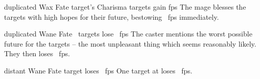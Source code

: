   {duplicated}%
  {Wax}%
  {Fate}%
  {target's Charisma}%
  {\spellArea{} targets gain  \glspl{fp}}%
  {
    The mage blesses the targets with high hopes for their future, bestowing \rollConv~\glspl{fp} immediately.
  }

  {duplicated}%
  {Wane}%
  {Fate}%
  {}%
  {\spellArea\ targets lose \rollConv~\glspl{fp}}%
  {
    The caster mentions the worst possible future for the targets -- the most unpleasant thing which seems reasonably likely.
    They then loses \rollConv~\glspl{fp}.
  }

  {distant}%
  {Wane}%
  {Fate}%
  {}%
  {target loses \rollConv~\glspl{fp}}%
  {
    One target at \spellRange{} loses \rollConv~\glspl{fp}.
  }


